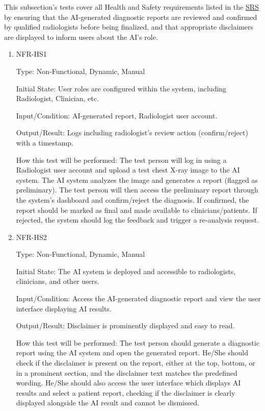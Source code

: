 \documentclass[12pt, titlepage]{article}
\begin{document}
This subsection's tests cover all Health and Safety requirements listed in the \href{https://github.com/RezaJodeiri/CXR-Capstone/blob/main/docs/SRS/SRS.pdf}{SRS} \citep{SRS}
 by ensuring that the AI-generated diagnostic reports are reviewed and confirmed by qualified radiologists before being finalized, and that appropriate disclaimers are displayed to inform users about the AI's role.

\begin{enumerate}

\item{NFR-HS1\\}\label{NFR-HS1}

Type: Non-Functional, Dynamic, Manual

Initial State: User roles are configured within the system, including Radiologist, Clinician, etc.

Input/Condition: AI-generated report, Radiologist user account.

Output/Result: Logs including radiologist’s review action (confirm/reject) with a timestamp.

How this test will be performed: The test person will log in using a Radiologist user account and upload a test chest X-ray image to the AI system. The AI system analyzes the image and generates a report (flagged as preliminary). The test person will then access the preliminary report through the system’s dashboard and confirm/reject the diagnosis. If confirmed, the report should be marked as final and made available to clinicians/patients. If rejected, the system should log the feedback and trigger a re-analysis request.

\item{NFR-HS2\\}\label{NFR-HS2}

Type: Non-Functional, Dynamic, Manual

Initial State: The AI system is deployed and accessible to radiologists, clinicians, and other users.

Input/Condition: Access the AI-generated diagnostic report and view the user interface displaying AI results.

Output/Result: Disclaimer is prominently displayed and easy to read.

How this test will be performed: The test person should generate a diagnostic report using the AI system and open the generated report. He/She should check if the disclaimer is present on the report, either at the top, bottom, or in a prominent section, and the disclaimer text matches the predefined wording. He/She should also access the user interface which displays AI results and select a patient report, checking if the disclaimer is clearly displayed alongside the AI result and cannot be dismissed.

\end{enumerate}
\end{document}
